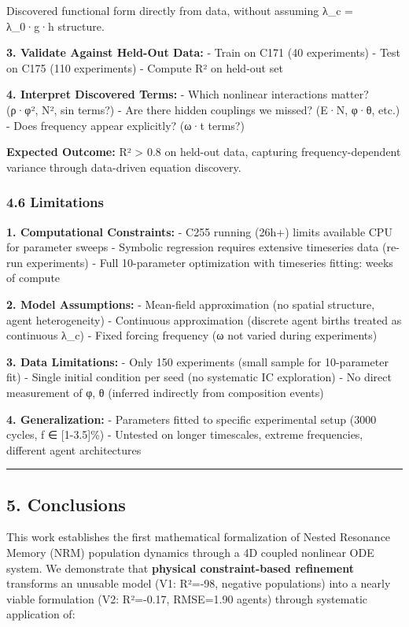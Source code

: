 \documentclass[
]{article}
\begin{document}
Discovered functional form directly from data, without assuming λ\_c =
λ\_0·g·h structure.

\textbf{3. Validate Against Held-Out Data:} - Train on C171 (40
experiments) - Test on C175 (110 experiments) - Compute R² on held-out
set

\textbf{4. Interpret Discovered Terms:} - Which nonlinear interactions
matter? (ρ·φ², N², sin terms?) - Are there hidden couplings we missed?
(E·N, φ·θ, etc.) - Does frequency appear explicitly? (ω·t terms?)

\textbf{Expected Outcome:} R² \textgreater{} 0.8 on held-out data,
capturing frequency-dependent variance through data-driven equation
discovery.

\subsubsection{4.6 Limitations}\label{limitations}

\textbf{1. Computational Constraints:} - C255 running (26h+) limits
available CPU for parameter sweeps - Symbolic regression requires
extensive timeseries data (re-run experiments) - Full 10-parameter
optimization with timeseries fitting: weeks of compute

\textbf{2. Model Assumptions:} - Mean-field approximation (no spatial
structure, agent heterogeneity) - Continuous approximation (discrete
agent births treated as continuous λ\_c) - Fixed forcing frequency (ω
not varied during experiments)

\textbf{3. Data Limitations:} - Only 150 experiments (small sample for
10-parameter fit) - Single initial condition per seed (no systematic IC
exploration) - No direct measurement of φ, θ (inferred indirectly from
composition events)

\textbf{4. Generalization:} - Parameters fitted to specific experimental
setup (3000 cycles, f ∈ {[}1-3.5{]}\%) - Untested on longer timescales,
extreme frequencies, different agent architectures

\begin{center}\rule{0.5\linewidth}{0.5pt}\end{center}

\subsection{5. Conclusions}\label{conclusions}

This work establishes the first mathematical formalization of Nested
Resonance Memory (NRM) population dynamics through a 4D coupled
nonlinear ODE system. We demonstrate that \textbf{physical
constraint-based refinement} transforms an unusable model (V1: R²=-98,
negative populations) into a nearly viable formulation (V2: R²=-0.17,
RMSE=1.90 agents) through systematic application of:
\end{document}

